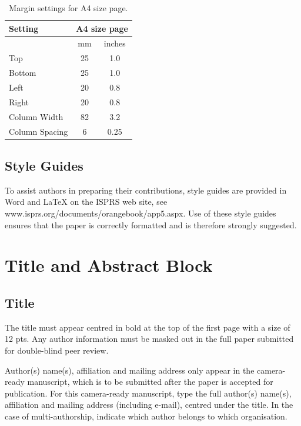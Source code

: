 \documentclass{isprs} %
\begin{document}
\begin{table}[h]
	\centering
		\begin{tabular}{|l|c|c|}\hline
			Setting&\multicolumn{2}{c|}{A4 size page}\\\hline
			  &mm&inches\\
			 Top&25&1.0\\
			 Bottom&25&1.0\\
			 Left&20&0.8\\
			 Right&20&0.8\\
			 Column Width&82&3.2\\
			 Column Spacing&6&0.25\\\hline
		\end{tabular}
	\caption{Margin settings for A4 size page.}
\label{tab:Margin_settings}
\end{table}

\subsection{Style Guides}\label{sec:Preparation in electronic form}

To assist authors in preparing their contributions, style guides are provided in Word and LaTeX on the ISPRS web site, see www.isprs.org/documents/orangebook/app5.aspx. Use of these style guides ensures that the paper is correctly formatted and is therefore strongly suggested.


\section{Title and Abstract Block}\label{sec:TITLE AND ABSTRACT BLOCK}

\subsection{Title}\label{sec:Title}

The title must appear centred in bold at the top of the first page with a size of 12 pts. Any author information must be masked out in the full paper submitted for double-blind peer review.

Author(s) name(s), affiliation and mailing address only appear in the camera-ready manuscript, which is to be submitted after the paper is accepted for publication. For this camera-ready manuscript, type the full author(s) name(s), affiliation and mailing address (including e-mail), centred under the title. In the case of multi-authorship, indicate which author belongs to which organisation.
\end{document}
